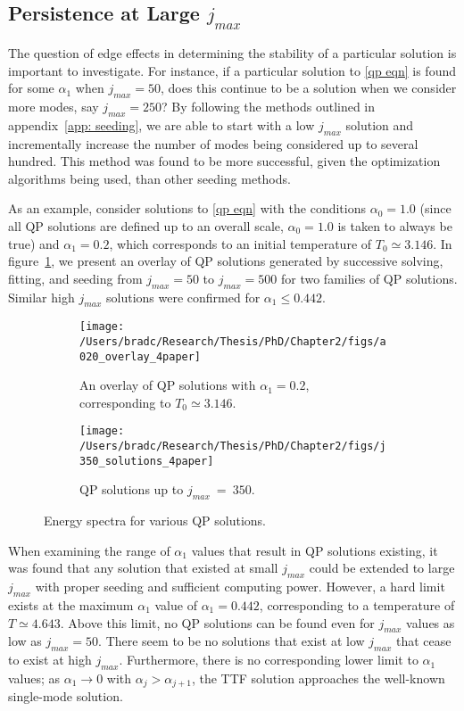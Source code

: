 \documentclass[../PhD.tex]{subfiles}
\begin{document}

\subsection{Persistence at Large $j_{max}$}
\label{ssec: large jmax}

The question of edge effects in determining the stability of a particular solution is important to investigate. For instance, if a particular solution to \eqref{qp eqn} is found for some $\alpha_1$ when $j_{max} = 50$, does this continue to be a solution when we consider more modes, say $j_{max} = 250$? By following the methods outlined in appendix~\ref{app: seeding}, we are able to start with a low $j_{max}$ solution and incrementally increase the number of modes being considered up to several hundred. This method was found to be more successful, given the optimization algorithms being used, than other seeding methods.

As an example, consider solutions to \eqref{qp eqn} with the conditions $\alpha_0 = 1.0$ (since all QP solutions are defined up to an overall scale, $\alpha_0 = 1.0$ is taken to always be true) and $\alpha_1 = 0.2$, which corresponds to an initial temperature of $T_0 \simeq 3.146$. In figure~\ref{fig: a0.2solns}, we present an overlay of QP solutions generated by successive solving, fitting, and seeding from $j_{max} = 50$ to $j_{max}=500$ for two families of QP solutions. Similar high $j_{max}$ solutions were confirmed for $\alpha_1 \leq 0.442$.

\begin{figure}[h]
	\centering
	\begin{subfigure}[t]{0.45\textwidth}
		\texttt{[image: /Users/bradc/Research/Thesis/PhD/Chapter2/figs/a020\_overlay\_4paper]}
		\caption{An overlay of QP solutions with $\alpha_1 = 0.2$, corresponding to $T_0 \simeq 3.146$.}
		\label{fig: a0.2solns}
	\end{subfigure}
	\:
	\begin{subfigure}[t]{0.45\textwidth}
		\texttt{[image: /Users/bradc/Research/Thesis/PhD/Chapter2/figs/j350\_solutions\_4paper]}
		\caption{QP solutions up to $j_{max}~=~350$.}
		\label{fig: j350 solutions}
	\end{subfigure}
	\caption{Energy spectra for various QP solutions.}
\end{figure}

When examining the range of $\alpha_1$ values that result in QP solutions existing, it was found that any solution that existed at small $j_{max}$ could be extended to large $j_{max}$ with proper seeding and sufficient computing power. However, a hard limit exists at the maximum $\alpha_1$ value of $\alpha_1=0.442$, corresponding to a temperature of $T \simeq 4.643$. Above this limit, no QP solutions can be found even for $j_{max}$ values as low as $j_{max}=50$. There seem to be no solutions that exist at low $j_{max}$ that cease to exist at high $j_{max}$. Furthermore, there is no corresponding lower limit to $\alpha_1$ values; as $\alpha_1 \to 0$ with $\alpha_j > \alpha_{j+1}$, the TTF solution approaches the well-known single-mode solution.
\end{document}
